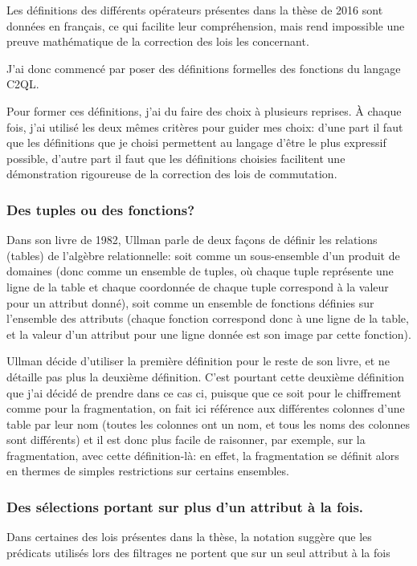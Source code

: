 Les définitions des différents opérateurs présentes dans la thèse de 2016
sont données en français, ce qui facilite leur compréhension, mais rend
impossible une preuve mathématique de la correction des lois les concernant.

J'ai donc commencé par poser des définitions formelles des fonctions du langage
C2QL.

Pour former ces définitions, j'ai du faire des choix à plusieurs reprises.
À chaque fois, j'ai utilisé les deux mêmes critères pour guider mes choix:
d'une part il faut que les définitions que je choisi permettent au langage
d'être le plus expressif possible, d'autre part il faut que les définitions
choisies facilitent une démonstration rigoureuse de la correction
des lois de commutation.

\subsubsection*{Des tuples ou des fonctions?}
Dans son livre de 1982, Ullman parle de deux
façons de définir les relations (tables) de l'algèbre relationnelle:
soit comme un sous-ensemble d'un produit de domaines
(donc comme un ensemble de tuples, où chaque
tuple représente une ligne
de la table et chaque coordonnée de chaque tuple correspond
à la valeur pour un attribut donné), soit comme un ensemble de fonctions
définies sur l'ensemble des attributs (chaque fonction correspond donc
à une ligne de la table, et la valeur d'un attribut pour une ligne donnée
est son image par cette fonction).

Ullman décide d'utiliser la première définition pour le reste de son livre,
et ne détaille pas plus la deuxième définition. C'est pourtant cette deuxième
définition que j'ai décidé de prendre dans ce cas ci, puisque que ce soit
pour le chiffrement comme pour la fragmentation, on fait ici référence aux différentes
colonnes d'une table par leur nom (toutes les colonnes ont un nom, et tous les
noms des colonnes sont différents) et il est donc plus facile de raisonner,
par exemple, sur la fragmentation, avec cette définition-là:
en effet, la fragmentation se définit alors en thermes de simples restrictions
sur certains ensembles.

\subsubsection*{Des sélections portant sur plus d'un attribut à la fois.}
Dans certaines des lois présentes dans la thèse, la notation
suggère que les prédicats utilisés lors des filtrages ne portent que sur
un seul attribut à la fois